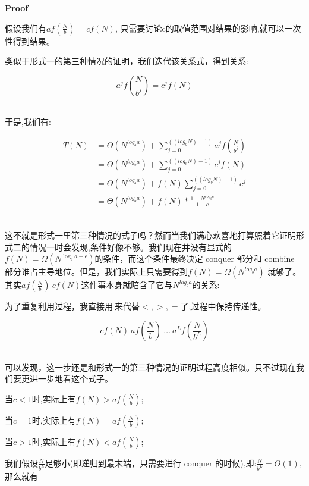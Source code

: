 \documentclass{article}
\begin{document}
\textbf{Proof}\par
假设我们有$af(\frac{N}{b}) = cf(N)$, 只需要讨论c的取值范围对结果的影响,就可以一次性得到结果。\par
类似于形式一的第三种情况的证明，我们迭代该关系式，得到关系:\par
$$a^jf(\frac{N}{b^j}) = c^j f(N)$$\\\hspace*{\fill}\par
于是,我们有:\par
\begin{align*}
    T(N)& = \Theta(N^{log_b a}) + \sum_{j=0}^{((log_b N) -1)} a^j f(\frac{N}{b^j})\\
        & = \Theta(N^{log_b a}) + \sum_{j=0}^{((log_b N) -1)} c^j f(N)\\
        & = \Theta(N^{log_b a}) + f(N) \sum_{j=0}^{((log_b N) -1)} c^j\\
        & = \Theta(N^{log_b a}) + f(N) * \frac{1 - N^{log_b c}}{1-c}
\end{align*}\\\hspace*{\fill}\par
这不就是形式一里第三种情况的式子吗？然而当我们满心欢喜地打算照着它证明形式二的情况一时会发现,条件好像不够。我们现在并没有显式的$f(N)=\Omega(N^{\log_b a+\epsilon})$的条件，而这个条件最终决定 conquer 部分和 combine 部分谁占主导地位。但是，我们实际上只需要得到$f(N) = \Omega(N^{log_b a})$ 就够了。其实$af(\frac{N}{b}) ~ cf(N)$这件事本身就暗含了它与$N^{log_b a}$的关系:
\\\hspace*{\fill}\par
为了重复利用过程，我直接用$~$来代替$<,>,=$了,过程中保持传递性。\par
$$cf(N)~af(\frac{N}{b})~\dots~a^Lf(\frac{N}{b^L})$$\\\hspace*{\fill}\par
可以发现，这一步还是和形式一的第三种情况的证明过程高度相似。只不过现在我们要更进一步地看这个式子。\par
当$c<1$时,实际上有$f(N) > af(\frac{N}{b})$;\par
当$c = 1$时,实际上有$f(N) = af(\frac{N}{b})$;\par
当$c > 1$时,实际上有$f(N)<af(\frac{N}{b})$;\\\hspace*{\fill}\par
我们假设$\frac{N}{b^L}$足够小(即递归到最末端，只需要进行 conquer 的时候),即:$\frac{N}{b^L} = \Theta(1)$,那么就有\par
\end{document}
